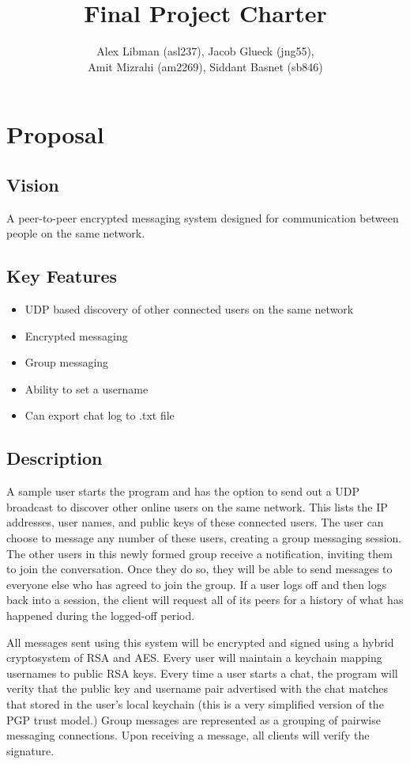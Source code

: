 \documentclass{scrartcl}
\title{Final Project Charter}
\author{Alex Libman (asl237), Jacob Glueck (jng55), \\Amit Mizrahi (am2269), Siddant Basnet (sb846)}
\date{}
\begin{document}
\maketitle

\section{Proposal}
\subsection{Vision}
A peer-to-peer encrypted messaging system designed for communication between people on the same network.

\subsection{Key Features}
\begin{itemize}
	\item UDP based discovery of other connected users on the same network 
	\item Encrypted messaging
	\item Group messaging
	\item Ability to set a username
	\item Can export chat log to .txt file
\end{itemize}

\subsection{Description}
A sample user starts the program and has the option to send out a UDP broadcast to discover other online users on the same network. This lists the IP addresses, user names, and public keys of these connected users. The user can choose to message any number of these users, creating a group messaging session. The other users in this newly formed group receive a notification, inviting them to join the conversation. Once they do so, they will be able to send messages to everyone else who has agreed to join the group. If a user logs off and then logs back into a session, the client will request all of its peers for a history of what has happened during the logged-off period.

All messages sent using this system will be encrypted and signed using a hybrid cryptosystem of RSA and AES. Every user will maintain a keychain mapping usernames to public RSA keys. Every time a user starts a chat, the program will verity that the public key and username pair advertised with the chat matches that stored in the user's local keychain (this is a very simplified version of the PGP trust model.) Group messages are represented as a grouping of pairwise messaging connections. Upon receiving a message, all clients will verify the signature.
\end{document}

